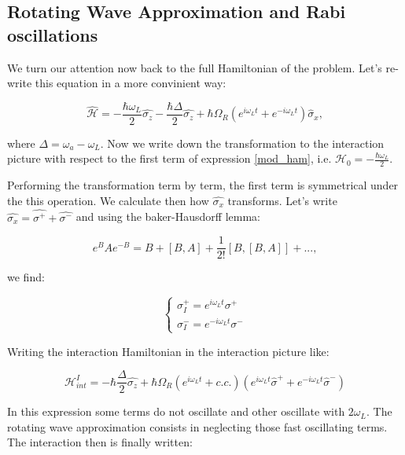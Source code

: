 \subsection{Rotating Wave Approximation and Rabi oscillations}

We turn our attention now back to the full Hamiltonian of the problem. Let's re-write this equation in a more convinient way:

\begin{equation} \label{mod_ham}
    \hat{\mathcal{H}} = - \frac {\hbar \omega_{L}}{2} \hat{\sigma_{z}} - \frac {\hbar \Delta} {2} \hat{\sigma_{z}} + \hbar \Omega_{R} (e^{i\omega_{L}t} + e^{-i\omega_{L}t}) \hat{\sigma}_{x},
\end{equation}

where $\Delta = \omega_{a} - \omega_{L}$. Now we write down the transformation to the interaction picture with respect to the first term of expression \ref{mod_ham}, i.e. $\mathcal{H}_{0} = - \frac {\hbar \omega_{L}}{2}$.

Performing the transformation term by term, the first term is symmetrical under the this operation. We calculate then how $\hat{\sigma_{x}}$ transforms. Let's write $\hat{\sigma_{x}} = \hat{\sigma^{+}} + \hat{\sigma^{-}}$ and using the baker-Hausdorff lemma:

\begin{equation}
    e^{B}Ae^{-B} = B + [B,A] + \frac{1}{2!} [B, [B,A]] + ...,
\end{equation}

we find:

\begin{equation}
\begin{cases}
    \sigma^{+}_{I} = e^{ i \omega_{L}t} \sigma^{+} \\
    \sigma^{-}_{I} = e^{ - i \omega_{L}t} \sigma^{-}
\end{cases}
\end{equation}

Writing the interaction Hamiltonian in the interaction picture like:

\begin{equation}
    \mathcal{H}_{int}^{I} = - \hbar \frac{\Delta}{2} \hat{\sigma_{z}} + \hbar\Omega_{R} (e^{i \omega_{L} t} + c.c.) (e^{i \omega_{L} t} \hat{\sigma}^{+} + e^{-i \omega_{L} t}\hat{\sigma}^{-})
\end{equation}

In this expression some terms do not oscillate and other oscillate with $2\omega_{L}$. The rotating wave approximation consists in neglecting those fast oscillating terms. The interaction then is finally written:

